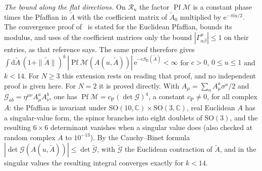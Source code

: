 \emph{The bound along the flat directions.} On \(\mathcal R_u\) the factor \(\operatorname{Pf}\mathcal M\) is a constant phase times the Pfaffian in \(\tilde A\) with the coefficient matrix of \(\tilde A_0\) multiplied by \(\mathrm e^{-\pi\mathrm iu/2}\). The convergence proof of~\cite{AustingWheater2001} is stated for the Euclidean Pfaffian, bounds its modulus, and uses of the coefficient matrices only the bound \(|\Gamma^\mu_{\alpha\beta}|\le1\) on their entries, as that reference says. The same proof therefore gives \(\int\mathrm d\tilde A\,(1+\|\tilde A\|)^k\,|\operatorname{Pf}\mathcal M(A(u,\tilde A))|\,\mathrm e^{-cS_{\mathrm E}(\tilde A)}<\infty\) for \(c>0\), \(0\le u\le1\) and \(k<14\). For \(N\ge3\) this extension rests on reading that proof, and no independent proof is given here. For \(N=2\) it is proved directly. With \(A_\mu=\sum_aA_\mu^a\sigma^a/2\) and \(\mathcal G_{ab}=\eta^{\mu\nu}A_\mu^aA_\nu^b\), one has \(\operatorname{Pf}\mathcal M=c_{\mathrm P}(\det\mathcal G)^4\), a constant \(c_{\mathrm P}\neq0\), for all complex \(A\): the Pfaffian is invariant under \(\mathrm{SO}(10,\mathbb C)\times\mathrm{SO}(3,\mathbb C)\), real Euclidean \(A\) has a singular-value form, the spinor branches into eight doublets of \(\mathrm{SO}(3)\), and the resulting \(6\times6\) determinant vanishes when a singular value does (also checked at random complex \(A\) to \(10^{-13}\)). By the Cauchy--Binet formula \(|\det\mathcal G(A(u,\tilde A))|\le\det\tilde{\mathcal G}\), with \(\tilde{\mathcal G}\) the Euclidean contraction of \(\tilde A\), and in the singular values the resulting integral converges exactly for \(k<14\).

